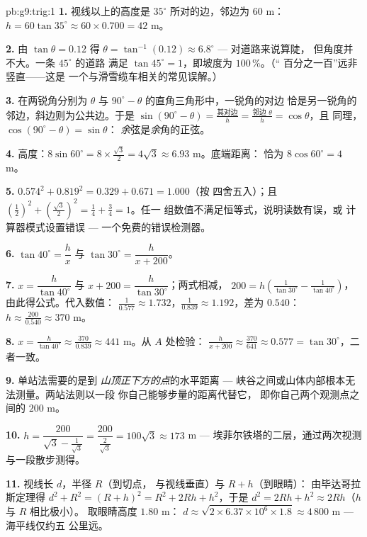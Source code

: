\begin{solution}{pb:g9:trig:1}
\textbf{1.} 视线以上的高度是
$35^\circ$ 所对的边，邻边为 $60$ m：
$h = 60 \tan 35^\circ \approx 60 \times 0.700 = 42$ m。

\textbf{2.} 由 $\tan\theta = 0.12$ 得
$\theta = \tan^{-1}(0.12) \approx 6.8^\circ$ --- 对道路来说算陡，
但角度并不大。一条 $45^\circ$ 的道路
满足 $\tan 45^\circ = 1$，即坡度为 $100\,\%$。（“
百分之一百”远非竖直——这是
一个与滑雪缆车相关的常见误解。）

\textbf{3.} 在两锐角分别为 $\theta$ 与
$90^\circ - \theta$ 的直角三角形中，一锐角的对边
恰是另一锐角的邻边，斜边则为公共边。于是
$\sin(90^\circ - \theta) = \frac{\text{其对边}}{h} =
\frac{\text{邻边 }\theta}{h} = \cos\theta$，且
同理，$\cos(90^\circ - \theta) = \sin\theta$：
\emph{余}弦是\emph{余}角的正弦。

\textbf{4.} 高度：$8 \sin 60^\circ = 8 \times
\frac{\sqrt3}{2} = 4\sqrt3 \approx 6.93$ m。底端距离：
恰为 $8 \cos 60^\circ = 4$ m。

\textbf{5.} $0.574^2 + 0.819^2 = 0.329 + 0.671 = 1.000$（按
四舍五入）；且 $\left(\frac12\right)^2 +
\left(\frac{\sqrt3}{2}\right)^2 = \frac14 + \frac34 = 1$。任一
组数值不满足恒等式，说明读数有误，或
计算器模式设置错误 --- 一个免费的错误检测器。

\textbf{6.} $\tan 40^\circ = \dfrac hx$ 与
$\tan 30^\circ = \dfrac{h}{x + 200}$。

\textbf{7.} $x = \dfrac{h}{\tan 40^\circ}$ 与
$x + 200 = \dfrac{h}{\tan 30^\circ}$；两式相减，
$200 = h\left(\frac{1}{\tan 30^\circ} -
\frac{1}{\tan 40^\circ}\right)$，由此得公式。代入数值：
$\frac{1}{0.577} \approx 1.732$，$\frac{1}{0.839} \approx
1.192$，差为 $0.540$：
$h \approx \frac{200}{0.540} \approx 370$ m。

\textbf{8.} $x = \frac{h}{\tan 40^\circ} \approx
\frac{370}{0.839} \approx 441$ m。从 $A$ 处检验：
$\frac{h}{x + 200} \approx \frac{370}{641} \approx 0.577 =
\tan 30^\circ$，二者一致。

\textbf{9.} 单站法需要的是到
\emph{山顶正下方的点}的水平距离 ---
峡谷之间或山体内部根本无法测量。两站法则以一段
你自己能够步量的距离代替它，
即你自己两个观测点之间的 $200$ m。

\textbf{10.} $h = \dfrac{200}{\sqrt3 - \frac{1}{\sqrt3}}
= \dfrac{200}{\frac{2}{\sqrt3}} = 100\sqrt3 \approx 173$ m ---
埃菲尔铁塔的二层，通过两次视测
与一段散步测得。

\textbf{11.} 视线长 $d$，半径 $R$（到切点，
与视线垂直）与 $R + h$（到眼睛）：
由毕达哥拉斯定理得 $d^2 + R^2 = (R + h)^2 = R^2 + 2Rh + h^2$，于是
$d^2 = 2Rh + h^2 \approx 2Rh$（$h$ 与 $R$ 相比极小）。
取眼睛高度 $1.80$ m：
$d \approx \sqrt{2 \times 6.37 \times 10^6 \times 1.8}
\approx 4\,800$ m --- 海平线仅约五
公里远。


\end{solution}

